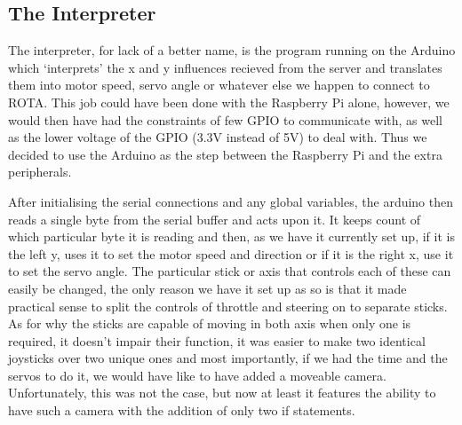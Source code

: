 \subsection{The Interpreter}
\par The interpreter, for lack of a better name, is the program running on the Arduino
which `interprets' the x and y influences recieved from the server and translates them
into motor speed, servo angle or whatever else we happen to connect to ROTA.
This job could have been done with the Raspberry Pi alone, however, we would then have
had the constraints of few GPIO to communicate with, as well as the lower voltage of
the GPIO (3.3V instead of 5V) to deal with. Thus we decided to use the Arduino as the
step between the Raspberry Pi and the extra peripherals.
\par After initialising the serial connections and any global variables, the arduino then
reads a single byte from the serial buffer and acts upon it. It keeps count of which particular
byte it is reading and then, as we have it currently set up, if it is the left y, uses
it to set the motor speed and direction or if it is the right x, use it to set the
servo angle. The particular stick or axis that controls each of these can easily be changed,
the only reason we have it set up as so is that it made practical sense to split
the controls of throttle and steering on to separate sticks. As for why the sticks
are capable of moving in both axis when only one is required, it doesn't impair their
function, it was easier to make two identical joysticks over two unique ones and
most importantly, if we had the time and the servos to do it, we would have like to
have added a moveable camera. Unfortunately, this was not the case, but now at least
it features the ability to have such a camera with the addition of only two if statements.
